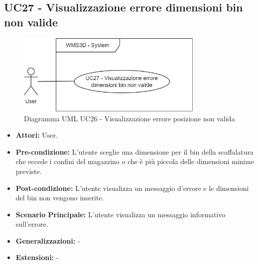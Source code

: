 \subsection{UC27 - Visualizzazione errore dimensioni bin non valide}
\begin{figure}[H]
  \centering
  \includegraphics[width=0.8\textwidth]{UC_diagrams_21-27/UC27.drawio.png}
  \caption{Diagramma UML UC26 - Visualizzazione errore posizione non valida}
\end{figure}
\begin{itemize}
    \item \textbf{Attori:} User.
    \item \textbf{Pre-condizione:}  L'utente sceglie una dimensione per il bin della scaffalatura che eccede i confini del magazzino o che è più piccola delle dimensioni minime previste.
    \item \textbf{Post-condizione:} L'utente visualizza un messaggio d'errore e le dimensioni del bin non vengono inserite.
    \item \textbf{Scenario Principale:} L'utente visualizza un messaggio informativo sull'errore.
    \item \textbf{Generalizzazioni:} -
    \item \textbf{Estensioni:} -
\end{itemize}